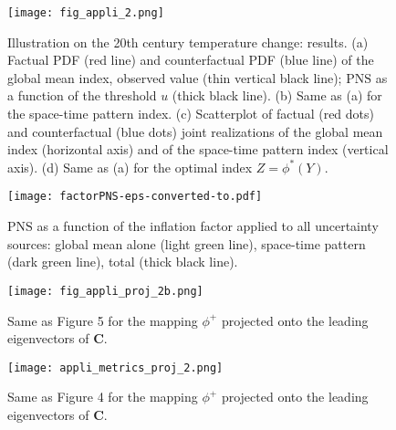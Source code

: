 \documentclass[12pt]{article}
\newcommand{\PNS}{\textrm{PNS}}
\begin{document}
\begin{figure}[t]
\begin{center} 
\noindent\texttt{[image: fig\_appli\_2.png]}\\
\end{center} 
\caption{Illustration on the 20th century temperature change: results. (a) Factual PDF (red line) and counterfactual PDF (blue line) of the global mean index, observed value (thin vertical black line); $\PNS$ as a function of the threshold $u$ (thick black line). (b) Same as (a) for the space-time pattern index. (c) Scatterplot of factual (red dots) and counterfactual (blue dots) joint realizations of the global mean index (horizontal axis) and of the space-time pattern index (vertical axis). (d) Same as (a) for the optimal index $Z=\phi^*(Y)$.}
\label{f4}
\end{figure}


\begin{figure}[t]
\begin{center} 
\noindent\texttt{[image: factorPNS-eps-converted-to.pdf]}\\
\end{center} 
\caption{$\PNS$ as a function of the inflation factor applied to all uncertainty sources: global mean alone (light green line), space-time pattern (dark green line), total (thick black line).}
\label{f4}
\end{figure}

\begin{figure}[t]
\begin{center} 
\noindent\texttt{[image: fig\_appli\_proj\_2b.png]}\\
\end{center} 
\caption{Same as Figure 5 for the mapping $\phi^+$ projected onto the leading eigenvectors of $\mathbf C$.}
\label{f4}
\end{figure}

\begin{figure}[t]
\begin{center} 
\noindent\texttt{[image: appli\_metrics\_proj\_2.png]}\\
\end{center} 
\caption{Same as Figure 4 for the mapping $\phi^+$ projected onto the leading eigenvectors of $\mathbf C$.}
\label{f4}
\end{figure}





\end{document}
